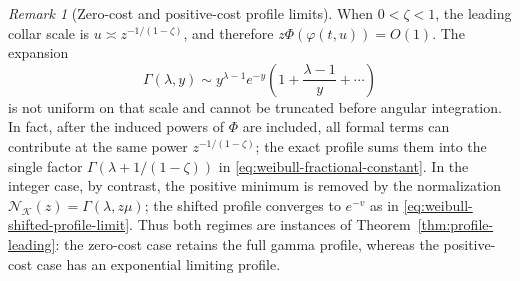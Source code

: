 \documentclass[11pt]{amsart}
\numberwithin{equation}{section}
\theoremstyle{definition}
\theoremstyle{remark}
\newtheorem{remark}[theorem]{Remark}
\begin{document}
\begin{remark}[Zero-cost and positive-cost profile limits]
\label{rem:weibull-exact-gamma}
When $0<\zeta<1$, the leading collar scale is
$u\asymp z^{-1/(1-\zeta)}$, and therefore
$z\Phi(\varphi(t,u))=O(1)$.  The expansion
\[
 \Gamma(\lambda,y)\sim y^{\lambda-1}e^{-y}
 \left(1+\frac{\lambda-1}{y}+\cdots\right)
\]
is not uniform on that scale and cannot be truncated before angular
integration.  In fact, after the induced powers of $\Phi$ are included, all
formal terms can contribute at the same power $z^{-1/(1-\zeta)}$; the exact
profile sums them into the single factor
$\Gamma(\lambda+1/(1-\zeta))$ in
\eqref{eq:weibull-fractional-constant}.  In the integer case, by contrast,
the positive minimum is removed by the normalization
$\mathcal N_{\mathcal K}(z)=\Gamma(\lambda,z\mu)$; the shifted profile converges to $e^{-v}$ as in
\eqref{eq:weibull-shifted-profile-limit}.  Thus both regimes are
instances of Theorem~\ref{thm:profile-leading}: the zero-cost case retains the
full gamma profile, whereas the positive-cost case has an exponential limiting
profile.
\end{remark}
\end{document}
